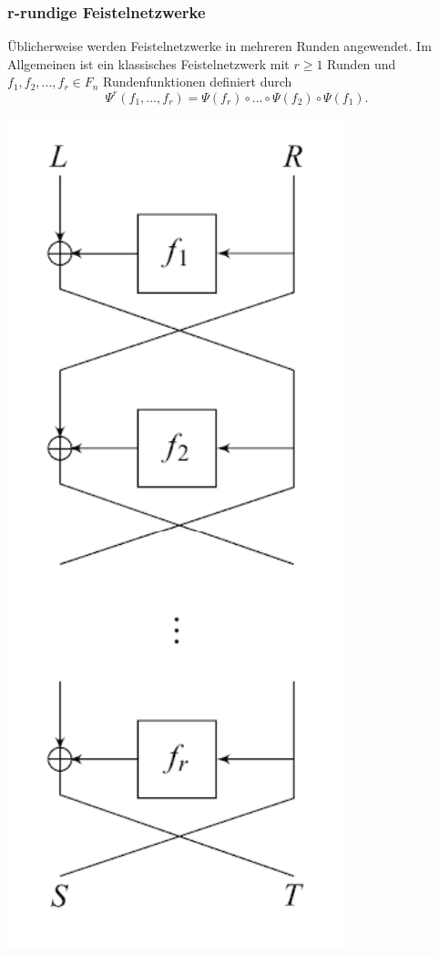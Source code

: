\documentclass[course=erap]{aspdoc}
\begin{document}
\subsubsection{r-rundige Feistelnetzwerke}

Üblicherweise werden Feistelnetzwerke in mehreren Runden angewendet. Im Allgemeinen ist ein klassisches Feistelnetzwerk mit $r \geq 1$ Runden und $f_1, f_2, ..., f_r \in F_n$ Rundenfunktionen definiert durch
\[
    \Psi^r(f_1, ..., f_r) = \Psi(f_r) \circ ... \circ \Psi(f_2) \circ \Psi(f_1).
\]\cite[p.12]{nachef}

\begin{center}
    \includegraphics[scale=1]{img/r_round_feistel_cipher_enc.png}\break
    \cite[Fig. 2.2]{nachef}
\end{center}
\end{document}
